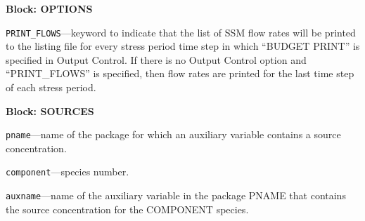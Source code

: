 
\item \textbf{Block: OPTIONS}

\begin{description}
\item \texttt{PRINT\_FLOWS}---keyword to indicate that the list of SSM flow rates will be printed to the listing file for every stress period time step in which ``BUDGET PRINT'' is specified in Output Control.  If there is no Output Control option and ``PRINT\_FLOWS'' is specified, then flow rates are printed for the last time step of each stress period.

\end{description}
\item \textbf{Block: SOURCES}

\begin{description}
\item \texttt{pname}---name of the package for which an auxiliary variable contains a source concentration.

\item \texttt{component}---species number.

\item \texttt{auxname}---name of the auxiliary variable in the package PNAME that contains the source concentration for the COMPONENT species.

\end{description}

